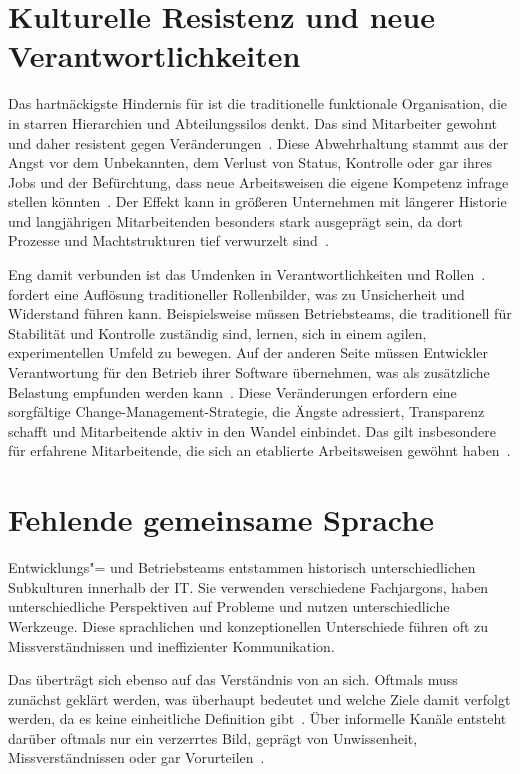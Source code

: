 \section{Kulturelle Resistenz und neue Verantwortlichkeiten}
Das hartnäckigste Hindernis für \DO ist die traditionelle funktionale Organisation, die in starren Hierarchien und Abteilungssilos denkt.
Das sind Mitarbeiter gewohnt und daher resistent gegen Veränderungen~\cite[1]{mak25}.
Diese Abwehrhaltung stammt aus der Angst vor dem Unbekannten, dem Verlust von Status, Kontrolle oder gar ihres Jobs und der Befürchtung, dass neue Arbeitsweisen die eigene Kompetenz infrage stellen könnten~\cites[2]{mak25}[312]{nay24}.
Der Effekt kann in größeren Unternehmen mit längerer Historie und langjährigen Mitarbeitenden besonders stark ausgeprägt sein, da dort Prozesse und Machtstrukturen tief verwurzelt sind~\cites[5]{kre22}[528]{win23}[594\psq]{riu16}.

Eng damit verbunden ist das Umdenken in Verantwortlichkeiten und Rollen~\cite[594]{riu16}.
\DO fordert eine Auflösung traditioneller Rollenbilder, was zu Unsicherheit und Widerstand führen kann.
Beispielsweise müssen Betriebsteams, die traditionell für Stabilität und Kontrolle zuständig sind, lernen, sich in einem agilen, experimentellen Umfeld zu bewegen.
Auf der anderen Seite müssen Entwickler Verantwortung für den Betrieb ihrer Software übernehmen, was als zusätzliche Belastung empfunden werden kann~\cite[5]{kre22}.
Diese Veränderungen erfordern eine sorgfältige Change-Management-Strategie, die Ängste adressiert, Transparenz schafft und Mitarbeitende aktiv in den Wandel einbindet.
Das gilt insbesondere für erfahrene Mitarbeitende, die sich an etablierte Arbeitsweisen gewöhnt haben~\cite[595]{riu16}.

\section{Fehlende gemeinsame Sprache}
Entwicklungs"= und Betriebsteams entstammen historisch unterschiedlichen Subkulturen innerhalb der IT\@.
Sie verwenden verschiedene Fachjargons, haben unterschiedliche Perspektiven auf Probleme und nutzen unterschiedliche Werkzeuge.
Diese sprachlichen und konzeptionellen Unterschiede führen oft zu Missverständnissen und ineffizienter Kommunikation.

Das überträgt sich ebenso auf das Verständnis von \DO an sich.
Oftmals muss zunächst geklärt werden, was \DO überhaupt bedeutet und welche Ziele damit verfolgt werden, da es keine einheitliche Definition gibt~\cite[528]{win23}.
Über informelle Kanäle entsteht darüber oftmals nur ein verzerrtes Bild, geprägt von Unwissenheit, Missverständnissen oder gar Vorurteilen~\cite[284]{kar24}.

